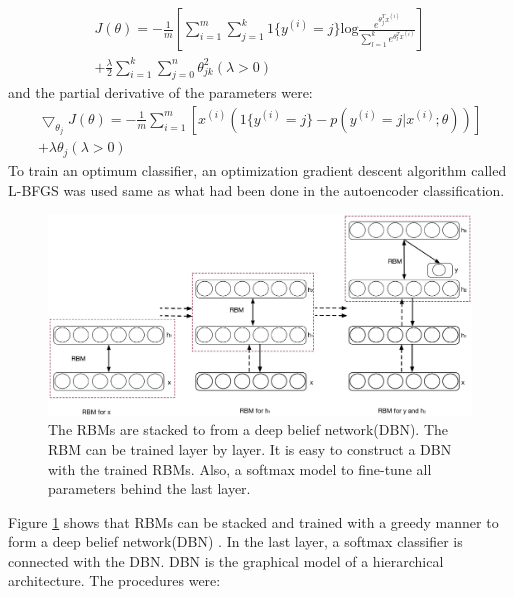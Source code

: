 \documentclass[graybox]{svmult}
\begin{document}
\begin{equation}
\begin{split}
J(\theta) = -\frac{1}{m}[\sum_{i=1}^m\sum_{j=1}^k1\{y^{(i)}=j\}\text{log}{\frac{e^{\theta_j^Tx^{(i)}}}{\sum_{l=1}^ke^{\theta_l^Tx^{(i)}}}}] \\
+ \frac{\lambda}{2} \sum_{i=1}^k \sum_{j=0}^n \theta_{jk}^2 (\lambda>0)
\end{split}
\end{equation}
and the partial derivative of the parameters were:
\begin{equation}
\begin{split}
\bigtriangledown_{\theta_j}J(\theta) = -\frac{1}{m}\sum_{i=1}^m[x^{(i)}(1\{y^{(i)}=j\}-p(y^{(i)}=j|x^{(i)};\theta))] \\
+ \lambda\theta_j  (\lambda>0)
\end{split}
\end{equation}
To train an optimum classifier, an optimization gradient descent algorithm called L-BFGS was used same as what had been done in the autoencoder classification.

\begin{figure}[b]
\sidecaption
\includegraphics[scale=.3]{dbn}
%
%
\caption{The RBMs are stacked to from a deep belief network(DBN). The RBM can be trained layer by layer. It is easy to construct a DBN with the trained RBMs. Also, a softmax model to fine-tune all parameters behind the last layer.}
\label{fig:5}       %
\end{figure}

Figure \ref{fig:5} shows that RBMs can be stacked and trained with a greedy manner to form a deep belief network(DBN) \citep{jurgen2015review, bengio2009learning}. In the last layer, a softmax classifier is connected with the DBN. DBN is the graphical model of a hierarchical architecture. The procedures were:
\end{document}
